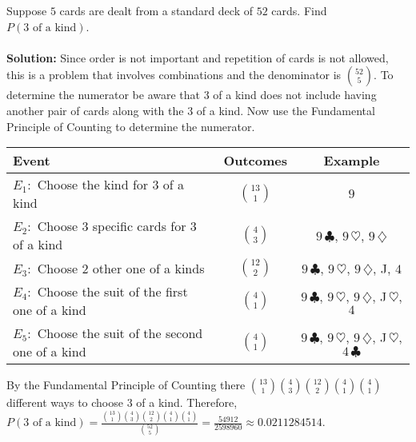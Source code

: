\documentclass[12pt]{article}%
\newcommand{\FPC}{Fundamental Principle of Counting }
\begin{document}
\noindent Suppose $5$ cards are dealt from a standard deck of $52$ cards. Find
$P(3 \mbox{ of a kind})$.\\\\
\textbf{Solution:} Since order is not important and repetition of 
cards is not allowed, this is a problem that involves combinations and
the denominator is $\binom{52}{5}$. To determine the numerator be aware
that $3$ of a kind does not include having another pair of cards along with 
the $3$ of a kind. Now use the \FPC to determine the numerator. 
\begin{center}
\begin{tabular}{lcc}
Event & Outcomes & Example\\
\hline
$E_1:$ Choose the kind for $3$ of a kind & $\binom{13}{1}$ & $9$ \\
$E_2:$ Choose $3$ specific cards for $3$ of a kind & $\binom{4}{3}$ & 
$9\,\clubsuit$, $9\,\heartsuit$, $9\,\diamondsuit$\\
$E_3:$ Choose $2$ other one of a kinds & $\binom{12}{2}$ & 
$9\,\clubsuit$, $9\,\heartsuit$, $9\,\diamondsuit$, J, $4$\\
$E_4:$ Choose the suit of the first one of a kind  & $\binom{4}{1}$ & 
$9\,\clubsuit$, $9\,\heartsuit$, $9\,\diamondsuit$, J\,$\heartsuit$, $4$\\
$E_5:$ Choose the suit of the second one of a kind & $\binom{4}{1}$ & 
$9\,\clubsuit$, $9\,\heartsuit$, $9\,\diamondsuit$, J\,$\heartsuit$, $4 \,\clubsuit$\\
\end{tabular}
\end{center}
By the \FPC there $\binom{13}{1}\binom{4}{3}\binom{12}{2}\binom{4}{1}\binom{4}{1}$  
different ways to choose $3$ of a kind. Therefore, $P(3 \mbox{ of a kind})=\frac{\binom{13}{1}\binom{4}{3}\binom{12}{2}\binom{4}{1}\binom{4}{1}}{\binom{52}{5}}=\frac{54912}{2598960} \approx 0.0211284514$.\\\\
\end{document}
